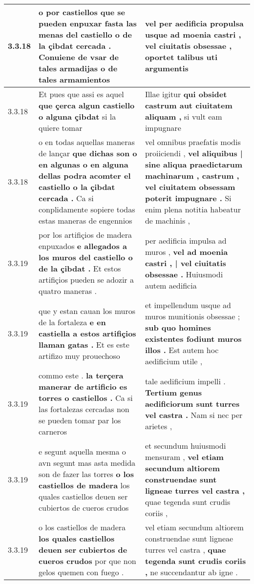 \begin{tabular}{|p{1cm}|p{6.5cm}|p{6.5cm}|}
3.3.18 & o por castiellos que se pueden enpuxar \textbf{ fasta las menas del castiello o de la çibdat cercada . } Conuiene de vsar de tales armadijas o de tales armamientos & vel per aedificia propulsa usque ad moenia castri , \textbf{ vel ciuitatis obsessae , } oportet talibus uti argumentis \\\hline
3.3.18 & Et pues que assi es aquel \textbf{ que çerca algun castiello o alguna çibdat } si la quiere tomar & Illae igitur \textbf{ qui obsidet castrum aut ciuitatem aliquam , } si vult eam impugnare \\\hline
3.3.18 & o en todas aquellas maneras de lançar \textbf{ que dichas son o en algunas o en alguna dellas podra acomter el castiello o la çibdat cercada . } Ca si conplidamente sopiere todas estas maneras de engennios & vel omnibus praefatis modis proiiciendi , \textbf{ vel aliquibus | sine aliqua praedictarum machinarum , castrum , vel ciuitatem obsessam poterit impugnare . } Si enim plena notitia habeatur de machinis , \\\hline
3.3.19 & por los artifiçios de madera enpuxados \textbf{ e allegados a los muros del castiello o de la çibdat . } Et estos artifiçios pueden se adozir a quatro maneras . & per aedificia impulsa ad muros , \textbf{ vel ad moenia castri , | vel ciuitatis obsessae . } Huiusmodi autem aedificia \\\hline
3.3.19 & que y estan cauan los muros de la fortaleza \textbf{ e en castiella a estos artifiçios llaman gatas . } Et es este artifizo muy prouechoso & et impellendum usque ad muros munitionis obsessae ; \textbf{ sub quo homines existentes fodiunt muros illos . } Est autem hoc aedificium utile , \\\hline
3.3.19 & commo este . \textbf{ la terçera manerar de artificio es torres o castiellos . } Ca si las fortalezas cercadas non se pueden tomar par los carneros & tale aedificium impelli . \textbf{ Tertium genus aedificiorum sunt turres vel castra . } Nam si nec per arietes , \\\hline
3.3.19 & e segunt aquella mesma o avn segunt mas asta medida son de fazer las torres \textbf{ o los castiellos de madera } los quales castiellos deuen ser cubiertos de cueros crudos & et secundum huiusmodi mensuram , \textbf{ vel etiam secundum altiorem construendae sunt ligneae turres vel castra , } quae tegenda sunt crudis coriis , \\\hline
3.3.19 & o los castiellos de madera \textbf{ los quales castiellos deuen ser cubiertos de cueros crudos } por que non gelos quemen con fuego . & vel etiam secundum altiorem construendae sunt ligneae turres vel castra , \textbf{ quae tegenda sunt crudis coriis , } ne succendantur ab igne . \\\hline

\end{tabular}
